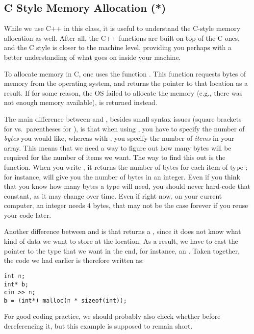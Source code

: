 \subsection{C Style Memory Allocation (*)} \label{sec:dynamic-memory:malloc-free}
While we use C++ in this class, it is useful to understand the C-style
memory allocation as well.
After all, the C++ functions are built on top of the C ones,
and the C style is closer to the machine level, providing you perhaps
with a better understanding of what goes on inside your machine.

To allocate memory in C, one uses the function
.
This function requests  bytes of memory from the operating
system, and returns the pointer to that location as a result. 
If for some reason, the OS failed to allocate the memory
(e.g., there was not enough memory available),
 is returned instead.

The main difference between  and ,
besides small syntax issues (square brackets for 
vs.~parentheses for ), is that when using ,
you have to specify the number of \emph{bytes} you would like,
whereas with , you specify the number of \emph{items} in
your array. 
This means that we need a way to figure out how many bytes will be
required for the number of items we want.
The way to find this out is the  function.
When you write , it returns the number of bytes for
each item of type ;
for instance,  will give you the number of bytes in
an integer.
Even if you think that you know how many bytes a type will need,
you should never hard-code that constant, as it may change over time.
Even if right now, on your current computer, an integer needs 4 bytes,
that may not be the case forever if you reuse your code later.

Another difference between  and  is that
 returns a ,
since it does not know what kind of data we want to store at the
location.
As a result, we have to cast the pointer to the type that we want in
the end, for instance, an .
Taken together, the code we had earlier is therefore written as:

\begin{verbatim}
int n;
int* b;
cin >> n;
b = (int*) malloc(n * sizeof(int));
\end{verbatim}

For good coding practice, we should probably also check whether
 before dereferencing it,
but this example is supposed to remain short.

